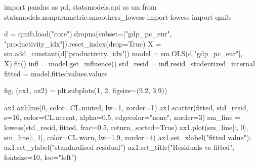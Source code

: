 \documentclass[
  letterpaper,
  10pt,
  twoside,
  openright,
  numbers=noenddot,
  chapterprefix=true]{scrbook}
\newenvironment{Shaded}{}{}
\newcommand{\DecValTok}[1]{\textcolor[rgb]{0.00,0.36,0.77}{#1}}
\newcommand{\FloatTok}[1]{\textcolor[rgb]{0.00,0.36,0.77}{#1}}
\newcommand{\ImportTok}[1]{\textcolor[rgb]{0.01,0.18,0.38}{#1}}
\newcommand{\NormalTok}[1]{\textcolor[rgb]{0.14,0.16,0.18}{#1}}
\newcommand{\OperatorTok}[1]{\textcolor[rgb]{0.14,0.16,0.18}{#1}}
\newcommand{\StringTok}[1]{\textcolor[rgb]{0.01,0.18,0.38}{#1}}
\newcommand{\VariableTok}[1]{\textcolor[rgb]{0.89,0.38,0.04}{#1}}
\begin{document}
\begin{Shaded}
\begin{Highlighting}[]
\ImportTok{import}\NormalTok{ pandas }\ImportTok{as}\NormalTok{ pd, statsmodels.api }\ImportTok{as}\NormalTok{ sm}
\ImportTok{from}\NormalTok{ statsmodels.nonparametric.smoothers\_lowess }\ImportTok{import}\NormalTok{ lowess}
\ImportTok{import}\NormalTok{ qmib}

\NormalTok{d }\OperatorTok{=}\NormalTok{ qmib.load(}\StringTok{"core"}\NormalTok{).dropna(subset}\OperatorTok{=}\NormalTok{[}\StringTok{"gdp\_pc\_eur"}\NormalTok{, }\StringTok{"productivity\_idx"}\NormalTok{]).reset\_index(drop}\OperatorTok{=}\VariableTok{True}\NormalTok{)}
\NormalTok{X }\OperatorTok{=}\NormalTok{ sm.add\_constant(d[}\StringTok{"productivity\_idx"}\NormalTok{])}
\NormalTok{model }\OperatorTok{=}\NormalTok{ sm.OLS(d[}\StringTok{"gdp\_pc\_eur"}\NormalTok{], X).fit()}
\NormalTok{infl }\OperatorTok{=}\NormalTok{ model.get\_influence()}
\NormalTok{std\_resid }\OperatorTok{=}\NormalTok{ infl.resid\_studentized\_internal}
\NormalTok{fitted }\OperatorTok{=}\NormalTok{ model.fittedvalues.values}

\NormalTok{fig, (ax1, ax2) }\OperatorTok{=}\NormalTok{ plt.subplots(}\DecValTok{1}\NormalTok{, }\DecValTok{2}\NormalTok{, figsize}\OperatorTok{=}\NormalTok{(}\FloatTok{9.2}\NormalTok{, }\FloatTok{3.9}\NormalTok{))}

\NormalTok{ax1.axhline(}\DecValTok{0}\NormalTok{, color}\OperatorTok{=}\NormalTok{CL.muted, lw}\OperatorTok{=}\DecValTok{1}\NormalTok{, zorder}\OperatorTok{=}\DecValTok{1}\NormalTok{)}
\NormalTok{ax1.scatter(fitted, std\_resid, s}\OperatorTok{=}\DecValTok{16}\NormalTok{, color}\OperatorTok{=}\NormalTok{CL.accent, alpha}\OperatorTok{=}\FloatTok{0.5}\NormalTok{, edgecolor}\OperatorTok{=}\StringTok{"none"}\NormalTok{, zorder}\OperatorTok{=}\DecValTok{3}\NormalTok{)}
\NormalTok{sm\_line }\OperatorTok{=}\NormalTok{ lowess(std\_resid, fitted, frac}\OperatorTok{=}\FloatTok{0.5}\NormalTok{, return\_sorted}\OperatorTok{=}\VariableTok{True}\NormalTok{)}
\NormalTok{ax1.plot(sm\_line[:, }\DecValTok{0}\NormalTok{], sm\_line[:, }\DecValTok{1}\NormalTok{], color}\OperatorTok{=}\NormalTok{CL.warn, lw}\OperatorTok{=}\FloatTok{1.9}\NormalTok{, zorder}\OperatorTok{=}\DecValTok{4}\NormalTok{)}
\NormalTok{ax1.set\_xlabel(}\StringTok{"fitted value"}\NormalTok{)}\OperatorTok{;}\NormalTok{ ax1.set\_ylabel(}\StringTok{"standardised residual"}\NormalTok{)}
\NormalTok{ax1.set\_title(}\StringTok{"Residuals vs fitted"}\NormalTok{, fontsize}\OperatorTok{=}\DecValTok{10}\NormalTok{, loc}\OperatorTok{=}\StringTok{"left"}\NormalTok{)}


\end{Highlighting}
\end{Shaded}
\end{document}
